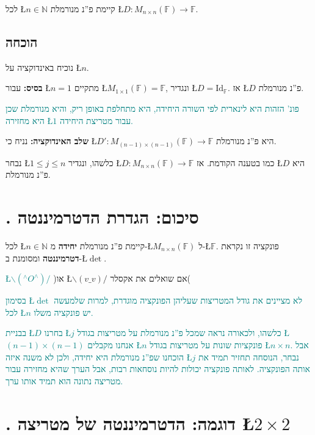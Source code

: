 \documentclass[english,hebrew]{article}
\begin{document}
לכל \L{$n\in\mathbb{N}$} קיימת פ\textquotedblright נ מנורמלת \L{$D:M_{n\times n}(\mathbb{F})\to\mathbb{F}$}.

\subsection{הוכחה}

נוכיח באינדוקציה על \L{$n$}.

\textbf{בסיס:} עבור \L{$n=1$} מתקיים \L{$M_{1\times1}(\mathbb{F})=\mathbb{F}$},
ונגדיר \L{$D=\text{Id}_{\mathbb{F}}$}. אז \L{$D$} פ\textquotedblright נ
מנורמלת.

\textcolor{teal}{פונ' הזהות היא לינארית לפי השורה היחידה, היא מתחלפת
באופן ריק, והיא מנורמלת שכן היא מחזירה \L{$1$} עבור מטריצת היחידה.}

\textbf{שלב האינדוקציה:} נניח כי \L{$D':M_{(n-1)\times(n-1)}(\mathbb{F})\to\mathbb{F}$}
היא פ\textquotedblright נ מנורמלת.

נבחר \L{$1\le j\le n$} כלשהו, ונגדיר \L{$D:M_{n\times n}(\mathbb{F})\to\mathbb{F}$}
כמו בטענה הקודמת. אז \L{$D$} היא פ\textquotedblright נ מנורמלת.

\medskip{}

\section{{\endL}. סיכום: הגדרת הדטרמיננטה}

לכל \L{$n\in\mathbb{N}$} קיימת פ\textquotedblright נ מנורמלת \textbf{יחידה}
מ-\L{$M_{n\times n}(\mathbb{F})$} ל-\L{$\mathbb{F}$}. פונקציה זו
נקראת \textbf{דטרמיננטה} ומסומנת ב-\L{$\det$}.

\textcolor{teal}{\L{$\backslash(^{\wedge}O^{\wedge})/$}} )או \L{$\backslash(v\_v)/$}
אם שואלים את אקסלר(

\textcolor{teal}{בסימון \L{$\det$} לא מציינים את גודל המטריצות שעליהן
הפונקציה מוגדרת, למרות שלמעשה לכל \L{$n$} יש פונקציה משלו.}

\textcolor{teal}{בבניית \L{$D$} בחרנו \L{$j$} כלשהו, ולכאורה נראה
שמכל פ\textquotedblright נ מנורמלת על מטריצות בגודל \L{$(n-1)\times(n-1)$}
אנחנו מקבלים \L{$n$} פונקציות שונות על מטריצות בגודל \L{$n\times n$}.
אבל הוכחנו שפ\textquotedblright נ מנורמלת היא יחידה, ולכן לא משנה
איזה \L{$j$} נבחר, הנוסחה תחזיר תמיד את אותה הפונקציה. לאותה פונקציה
יכולות להיות נוסחאות רבות, אבל הערך שהיא מחזירה עבור מטריצה נתונה
הוא תמיד אותו ערך.}

\section{{\endL}. דוגמה: הדטרמיננטה של מטריצה \L{$2\times2$}}
\end{document}
